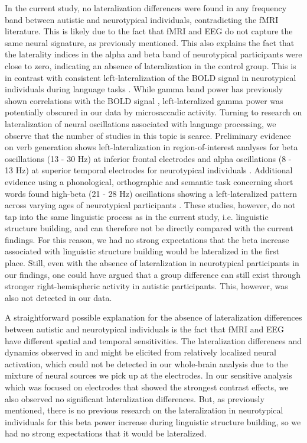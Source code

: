 In the current study, no lateralization differences were found in any frequency band between autistic and neurotypical individuals, contradicting the fMRI literature. This is likely due to the fact that fMRI and EEG do not capture the same neural signature, as previously mentioned. This also explains the fact that the laterality indices in the alpha and beta band of neurotypical participants were close to zero, indicating an absence of lateralization in the control group. This is in contrast with consistent left-lateralization of the BOLD signal in neurotypical individuals during language tasks \citep{fedorenko2010,pallier2011}. While gamma band power has previously shown correlations with the BOLD signal \citep{scheeringa2016}, left-lateralized gamma power was potentially obscured in our data by microsaccadic activity. Turning to research on lateralization of neural oscillations associated with language processing, we observe that the number of studies in this topic is scarce. Preliminary evidence on verb generation shows left-lateralization in region-of-interest analyses for beta oscillations (13 - 30 Hz) at inferior frontal electrodes and alpha oscillations (8 - 13 Hz) at superior temporal electrodes for neurotypical individuals \citep{nix2024}. Additional evidence using a phonological, orthographic and semantic task concerning short words found high-beta (21 - 28 Hz) oscillations showing a left-lateralized pattern across varying ages of neurotypical participants \citep{spironelli2010}. These studies, however, do not tap into the same linguistic process as in the current study, i.e. linguistic structure building, and can therefore not be directly compared with the current findings. For this reason, we had no strong expectations that the beta increase associated with linguistic structure building would be lateralized in the first place. Still, even with the absence of lateralization in neurotypical participants in our findings, one could have argued that a group difference can still exist through stronger right-hemispheric activity in autistic participants. This, however, was also not detected in our data. 

A straightforward possible explanation for the absence of lateralization differences between autistic and neurotypical individuals is the fact that fMRI and EEG have different spatial and temporal sensitivities. The lateralization differences and dynamics observed in \cite{jouravlev2020} and \cite{fedorenko2016} might be elicited from relatively localized neural activation, which could not be detected in our whole-brain analysis due to the mixture of neural sources we pick up at the electrodes. In our sensitive analysis which was focused on electrodes that showed the strongest contrast effects, we also observed no significant lateralization differences. But, as previously mentioned, there is no previous research on the lateralization in neurotypical individuals for this beta power increase during linguistic structure building, so we had no strong expectations that it would be lateralized. 

